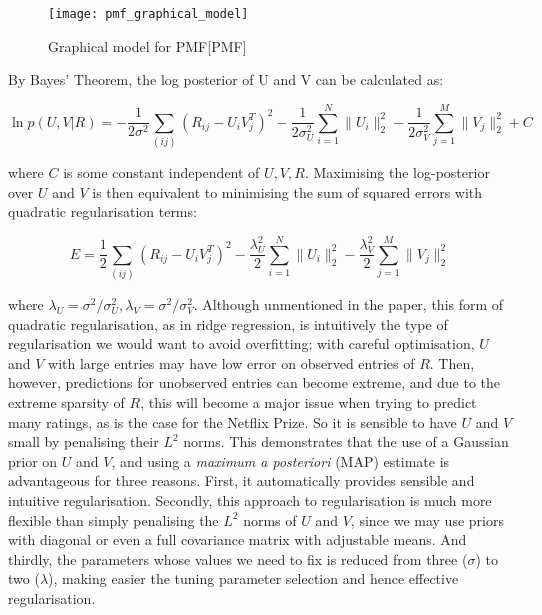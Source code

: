 \documentclass{article}
\theoremstyle{plain}
\begin{document}
\begin{figure}[h]
\begin{center}
\centerline{\texttt{[image: pmf\_graphical\_model]}}
\end{center}
\caption{Graphical model for PMF[PMF]}
\end{figure}

By Bayes' Theorem, the log posterior of U and V can be calculated as:

\begin{equation}
\ln p(U,V|R)=-\frac{1}{2\sigma^2}\sum_{(ij)}(R_{ij}-U_iV_j^T)^2 - \frac{1}{2\sigma_U^2}\sum_{i=1}^N \|U_i\|_2^2-\frac{1}{2\sigma_V^2}\sum_{j=1}^M \|V_j\|_2^2 + C
\end{equation}

where $C$ is some constant independent of $U,V,R$. Maximising the log-posterior over $U$ and $V$ is then equivalent to minimising the sum of squared errors with quadratic regularisation terms:

\begin{equation}
E=\frac{1}{2}\sum_{(ij)}(R_{ij}-U_iV_j^T)^2 - \frac{\lambda_U^2}{2}\sum_{i=1}^N \|U_i\|_2^2-\frac{\lambda_V^2}{2}\sum_{j=1}^M \|V_j\|_2^2
\end{equation}

where $\lambda_U=\sigma^2/\sigma_U^2, \lambda_V=\sigma^2/\sigma_V^2$. Although unmentioned in the paper, this form of quadratic regularisation, as in ridge regression, is intuitively the type of regularisation we would want to avoid overfitting; with careful optimisation, $U$ and $V$ with large entries may have low error on observed entries of $R$. Then, however, predictions for unobserved entries can become extreme, and due to the extreme sparsity of $R$, this will become a major issue when trying to predict many ratings, as is the case for the Netflix Prize. So it is sensible to have $U$ and $V$ small by penalising their $L^2$ norms. This demonstrates that the use of a Gaussian prior on $U$ and $V$, and using a \textit{maximum a posteriori} (MAP) estimate is advantageous for three reasons. First, it automatically provides sensible and intuitive regularisation. Secondly, this approach to regularisation is much more flexible than simply penalising the $L^2$ norms of $U$ and $V$, since we may use priors with diagonal or even a full covariance matrix with adjustable means. And thirdly, the parameters whose values we need to fix is reduced from three ($\sigma$) to two ($\lambda$), making easier the tuning parameter selection and hence effective regularisation.
\end{document}

